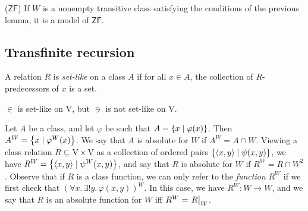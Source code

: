 \begin{corollary}
    (\( \mathsf{ZF} \))
    If \( W \) is a nonempty transitive class satisfying the conditions of the previous lemma, it is a model of \( \mathsf{ZF} \).
\end{corollary}

\subsection{Transfinite recursion}
\begin{definition}
    A relation \( R \) is \emph{set-like} on a class \( A \) if for all \( x \in A \), the collection of \( R \)-predecessors of \( x \) is a set.
\end{definition}
\begin{example}
    \( \in \) is set-like on \( \mathrm{V} \), but \( \ni \) is not set-like on \( \mathrm{V} \).
\end{example}
Let \( A \) be a class, and let \( \varphi \) be such that \( A = \qty{x \mid \varphi(x)} \).
Then \( A^W = \qty{x \mid \varphi^W(x)} \).
We say that \( A \) is absolute for \( W \) if \( A^W = A \cap W \).
Viewing a class relation \( R \subseteq \mathrm{V} \times \mathrm{V} \) as a collection of ordered pairs \( \qty{\langle x, y \rangle \mid \psi(x, y)} \), we have \( R^W = \qty{\langle x, y \rangle \mid \psi^W(x, y)} \), and say that \( R \) is absolute for \( W \) if \( R^W = R \cap W^2 \).
Observe that if \( R \) is a class function, we can only refer to the \emph{function} \( R^W \) if we first check that \( (\forall x.\, \exists! y.\, \varphi(x, y))^W \).
In this case, we have \( R^W : W \to W \), and we say that \( R \) is an absolute function for \( W \) iff \( R^W = \eval{R}_W \).

